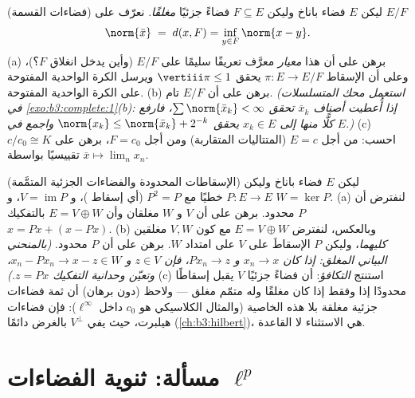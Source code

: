 \begin{exercise}[$\star\star$]\label{exo:b3:banach:11}
(فضاءات القسمة) ليكن $E$ فضاء باناخ وليكن $F \subseteq
E$ فضاءً جزئيًا
\emph{مغلقًا}. نعرّف على $E/F$
\[
\norm{\bar x} \;=\; d(x, F) = \inf_{y\in F}\norm{x - y} .
\]
(a) برهن على أن هذا \emph{معيار} معرَّف تعريفًا سليمًا على $E/F$
(وأين يدخل انغلاق $F$؟)، وعلى أن الإسقاط $\pi
\colon E \to E/F$ يحقق $\vertiii\pi \leq 1$
ويرسل الكرة الواحدية المفتوحة على الكرة الواحدية المفتوحة.
(b) برهن على أن $E/F$ تام. \emph{(استعمل محك المتسلسلات في
\cref{exo:b3:complete:1}(b): إذا أُعطيت أصناف $\bar x_k$ تحقق $\sum\norm{\bar x_k} < \infty$، فارفع
كلًّا منها إلى $x_k \in E$ يحقق $\norm{x_k} \leq \norm{\bar x_k} + 2^{-k}$ واجمع في $E$.)}
(c) احسب: من أجل $E = c$ (المتتاليات المتقاربة) ومن أجل $F =
c_0$،
برهن على $c/c_0 \cong K$ تقييسيًا بواسطة $\bar x \mapsto
\lim_nx_n$.
\end{exercise}

\begin{exercise}[$\star\star$]\label{exo:b3:banach:12}
(الإسقاطات المحدودة والفضاءات الجزئية المتمَّمة) ليكن $E$ فضاء
باناخ وليكن $P \colon E \to E$ خطيًا مع $P^2 = P$ (أي إسقاط )،
و $V = \operatorname{im}P$، و $W =
\ker P$.
(a) لنفترض أن $P$ محدود. برهن على أن $V$ و $W$ مغلقان وأن
$E = V \oplus W$ بالتفكيك $x = Px + (x -
Px)$.
(b) وبالعكس، لنفترض $E = V \oplus W$ مع كون $V,
W$ مغلقين
\emph{كليهما}، وليكن $P$ الإسقاطَ على $V$ على امتداد $W$. برهن
على أن $P$ محدود. \emph{(بالمنحني البياني المغلق: إذا كان
$x_n \to x$ و $Px_n \to z$، فإن $z \in V$ و $x_n - Px_n \to x - z \in
W$، وتعيّن
وحدانية التفكيك $z =
Px$.)}
(c) استنتج \emph{التكافؤ}: أن فضاءً جزئيًا $V$ يقبل إسقاطًا
محدودًا إذا وفقط إذا كان مغلقًا وله متمّم  مغلق --- ولاحظ
(دون برهان) أن ثمة فضاءات جزئية مغلقة بلا هذه الخاصية (والمثال
الكلاسيكي هو $c_0$ داخل $\ell^\infty$): فإن فضاءات هيلبرت،
حيث يفي $V^\perp$ بالغرض دائمًا (\cref{ch:b3:hilbert})، هي الاستثناء لا
القاعدة.
\end{exercise}

\section{مسألة: ثنوية الفضاءات \texorpdfstring{$\ell^p$}%
{lp}}

